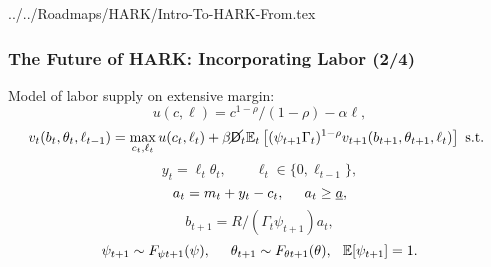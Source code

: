 \documentclass[11ptt]{beamer}
\begin{document}
\begin{verbatimwrite}{../../Roadmaps/HARK/Intro-To-HARK-From.tex}
  \begin{frame}
    \frametitle{The Future of HARK: Incorporating Labor (2/4)}
    Model of labor supply on extensive margin:
    \begin{equation*}
      u(c,\ell) = c^{1-\rho}/(1-\rho) - \alpha \ell,
    \end{equation*}
    \begin{equation*}
      v_t(b_t,\theta_t,\ell_{t-1}) = \max_{c_t, \ell_t} u(c_t,\ell_t) + \beta \cancel{\mathsf{D}}_t \mathbb{E}_t \left[(\psi_{t+1} \Gamma_t)^{1-\rho} v_{t+1}(b_{t+1},\theta_{t+1},\ell_t) \right] \text{ s.t. }
    \end{equation*}
    \begin{equation*}
      y_t = \ell_t \theta_t, \qquad \ell_t \in \{0,\ell_{t-1}\},
    \end{equation*}
    \begin{equation*}
      a_t = m_t + y_t - c_t, \hspace{0.5cm} a_t \geq \underline{a},
    \end{equation*}
    \begin{equation*}
      b_{t+1} = R/(\Gamma_t \psi_{t+1}) a_t, 
    \end{equation*}
    \begin{equation*}
      \psi_{t+1} \sim F_{\psi t+1}(\psi), \hspace{0.5cm} \theta_{t+1} \sim F_{\theta t+1}(\theta), \hspace{0.25cm} \mathbb{E}[\psi_{t+1}] = 1.
    \end{equation*}
  \end{frame}




\end{verbatimwrite}
\end{document}
